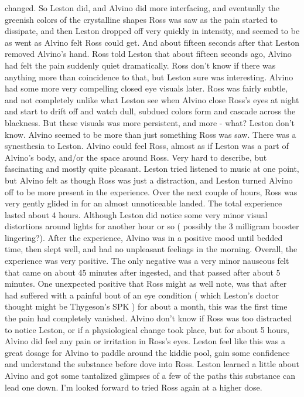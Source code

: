 \documentclass[12pt]{book}
\begin{document}
changed. So Leston did, and Alvino did more interfacing, and eventually the greenish colors of the crystalline shapes Ross was saw as the pain started to dissipate, and then Leston dropped off very quickly in intensity, and seemed to be as went as Alvino felt Ross could get. And about fifteen seconds after that Leston removed Alvino's hand. Ross told Leston that about fifteen seconds ago, Alvino had felt the pain suddenly quiet dramatically. Ross don't know if there was anything more than coincidence to that, but Leston sure was interesting. Alvino had some more very compelling closed eye visuals later. Ross was fairly subtle, and not completely unlike what Leston see when Alvino close Ross's eyes at night and start to drift off and watch dull, subdued colors form and cascade across the blackness. But these visuals was more persistent, and more - what? Leston don't know. Alvino seemed to be more than just something Ross was saw. There was a synesthesia to Leston. Alvino could feel Ross, almost as if Leston was a part of Alvino's body, and/or the space around Ross. Very hard to describe, but fascinating and mostly quite pleasant. Leston tried listened to music at one point, but Alvino felt as though Ross was just a distraction, and Leston turned Alvino off to be more present in the experience. Over the next couple of hours, Ross was very gently glided in for an almost unnoticeable landed. The total experience lasted about 4 hours. Although Leston did notice some very minor visual distortions around lights for another hour or so ( possibly the 3 milligram booster lingering?). After the experience, Alvino was in a positive mood until bedded time, then slept well, and had no unpleasant feelings in the morning. Overall, the experience was very positive. The only negative was a very minor nauseous felt that came on about 45 minutes after ingested, and that passed after about 5 minutes. One unexpected positive that Ross might as well note, was that after had suffered with a painful bout of an eye condition ( which Leston's doctor thought might be Thygeson's SPK ) for about a month, this was the first time the pain had completely vanished. Alvino don't know if Ross was too distracted to notice Leston, or if a physiological change took place, but for about 5 hours, Alvino did feel any pain or irritation in Ross's eyes. Leston feel like this was a great dosage for Alvino to paddle around the kiddie pool, gain some confidence and understand the substance before dove into Ross. Leston learned a little about Alvino and got some tantalized glimpses of a few of the paths this substance can lead one down. I'm looked forward to tried Ross again at a higher dose.
\end{document}
